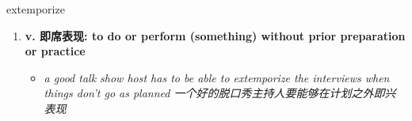 
\begin{frame}
{\huge extemporize}
\begin{center}
\begin{enumerate}\Large
  \item \textbf{v. 即席表现: to do or perform (something) without prior preparation or practice}
  \begin{itemize}
    \item \em{\Large{a good talk show host has to be able to extemporize the interviews when things don't go as planned 一个好的脱口秀主持人要能够在计划之外即兴表现}}
  \end{itemize}
\end{enumerate}
\end{center}
\end{frame}
